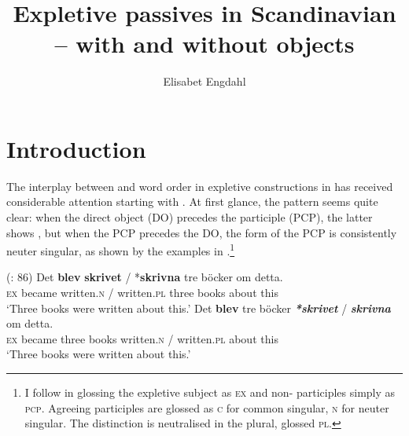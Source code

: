 \documentclass[output=paper]{LSP/langsci}
\author{Elisabet Engdahl\affiliation{University of Gothenburg}
}
\title{Expletive passives in Scandinavian -- with and without objects}
\begin{document}
\section{Introduction}%
\largerpage

The interplay between  and word order in expletive  constructions in  has received considerable attention starting with \cite{ChristensenTaraldsen1989}. At first glance, the pattern seems quite clear: when the direct object (DO) precedes the participle (PCP), the latter shows , but when the PCP precedes the DO, the form of the PCP is consistently neuter singular, as shown by the  examples in .\footnote{I follow \citet[104]{Holmberg2002Expletives} in glossing the expletive subject as \textsc{ex} and non- participles simply as \textsc{pcp}. Agreeing participles are glossed as \textsc{c} for common  singular, \textsc{n} for neuter singular. The  distinction is neutralised in the plural, glossed \textsc{pl}. 
}

\ea%
    \label{ex:engdahl:1}
     (\citealt{Holmberg2002}: 86)
\ea\label{ex:engdahl:1a}
\gll Det \textbf{blev}     \textbf{skrivet} /     *\textbf{skrivna}     tre     böcker   om     detta. \\
  \textsc{ex}   became written.\textsc{n} /    written\textsc{.pl}   three books     about   this \\
\glt ‘Three books were written about this.'
\ex\label{ex:engdahl:1b}
\gll    Det     \textbf{blev}     tre     böcker \textbf{\textit{*skrivet}} /     \textbf{\textit{skrivna}}     om     detta.\\
  \textsc{ex}   became three  books     written.\textsc{n} / written.\textsc{pl} about  this \\
  \glt ‘Three books were written about this.'
\z
\z
\end{document}
